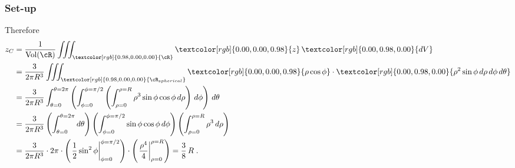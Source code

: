 \begin{frame}
\frametitle{Set-up}

Therefore
%
\begin{align*}
  z_C & = \frac{1}{\text{Vol}(\cR)} \int\!\!\!\int\!\!\!\int_{\textcolor[rgb]{0.98,0.00,0.00}{\cR}} \textcolor[rgb]{0.00,0.00,0.98}{z}\, \textcolor[rgb]{0.00,0.98,0.00}{dV}\;  \\
  & = \frac{3}{2\pi R^3} \int\!\!\!\int\!\!\!\int_{\textcolor[rgb]{0.98,0.00,0.00}{\cR_{spherical}}} \textcolor[rgb]{0.00,0.00,0.98}{\rho \cos\phi} \cdot 
  \textcolor[rgb]{0.00,0.98,0.00}{\rho^2\sin\phi \, d\rho\, d\phi\,d\theta} \\
  & = \frac{3}{2\pi R^3} \int_{\theta =0}^{\theta=2\pi} \left(
  \int_{\phi = 0}^{\phi=\pi/2} \left(
  \int_{\rho = 0}^{\rho = R} \rho^3 \sin\phi\cos\phi \, d\rho
  \right) \, d\phi
  \right) \, d\theta  \\
  & = \frac{3}{2\pi R^3} \left(\int_{\theta =0}^{\theta=2\pi} d\theta \right) \left( \int_{\phi = 0}^{\phi=\pi/2} \sin\phi\cos\phi\, d\phi \right) \left( \int_{\rho = 0}^{\rho = R} \rho^3 \, d\rho \right)  \\
  & = \frac{3}{2\pi R^3} \cdot 2\pi \cdot \left( \left. \frac{1}{2}\sin^2\phi \right|_{\phi=0}^{\phi=\pi/2}\right) \cdot \left( \left. \frac{\rho^4}{4} \right|_{\rho=0}^{\rho=R} \right) = \frac{3}{8} \, R\; .
\end{align*}
\end{frame}








